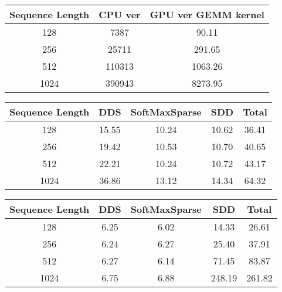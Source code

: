 \renewcommand{\arraystretch}{1.2}
\setlength{\tabcolsep}{7.5pt}
\begin{table*}[t]
\small
\centering
\begin{subtable}{\textwidth}\centering
\begin{tabular}{||c|c|c||}
\hline
Sequence Length & CPU ver & GPU ver GEMM kernel \\ [0.5ex] 
\hline\hline

128 & 7387 & 90.11 \\
256 & 25711 & 291.65 \\
512 & 110313 & 1063.26 \\
1024 & 390943 & 8273.95 \\

\hline
\end{tabular}
\caption{Naive (full) attention on CPU and GPU}
\end{subtable}
\begin{subtable}{\textwidth}\centering
\begin{tabular}{||c|ccc|c||}
\hline

Sequence Length & DDS & SoftMaxSparse & SDD & Total \\ [0.5ex] 

\hline\hline

128 & 15.55 & 10.24 & 10.62 & 36.41 \\
256 & 19.42 & 10.53 & 10.70 & 40.65 \\
512 & 22.21 & 10.24 & 10.72 & 43.17 \\
1024 & 36.86 & 13.12 & 14.34 & 64.32 \\

\hline
\end{tabular}
\caption{Window-sparse attention on GPU}
\end{subtable}
\begin{subtable}{\textwidth}\centering
\begin{tabular}{||c|c c c|c||}
\hline
Sequence Length & DDS & SoftMaxSparse & SDD & Total \\ [0.5ex] 
\hline
\hline
128 & 6.25 & 6.02 & 14.33 & 26.61 \\
256 & 6.24 & 6.27 & 25.40 & 37.91 \\
512 & 6.27 & 6.14 & 71.45 & 83.87 \\
1024 & 6.75 & 6.88 & 248.19 & 261.82 \\


\end{tabular}
\end{subtable}
\end{table*}
